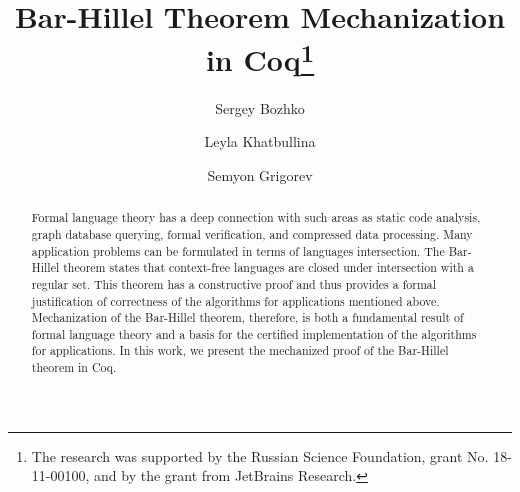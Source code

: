 \documentclass[runningheads]{llncs}
\begin{document}
%
\title{Bar-Hillel Theorem Mechanization in Coq\thanks{The research was supported by the Russian Science Foundation, grant
  No. 18-11-00100, and by the grant from JetBrains Research.}}
%
%
\author{Sergey Bozhko \and
Leyla Khatbullina \and
Semyon Grigorev}
%
%
%
\maketitle              %
%
\begin{abstract}
Formal language theory has a deep connection with such areas as static code analysis, graph database querying, formal verification, and compressed data processing.
Many application problems can be formulated in terms of languages intersection.
The Bar-Hillel theorem states that context-free languages are closed under intersection with a regular set.
This theorem has a constructive proof and thus provides a formal justification of correctness of the algorithms for applications mentioned above.
Mechanization of the Bar-Hillel theorem, therefore, is both a fundamental result of formal language theory and a basis for the certified implementation of the algorithms for applications.
In this work, we present the mechanized proof of the Bar-Hillel theorem in Coq.

\end{abstract}
%
%
%


%




%
%
%
 
 
%
\appendix

\end{document}
